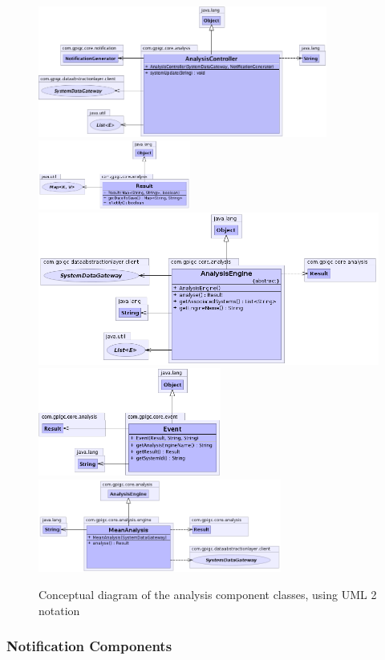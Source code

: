 \documentclass[10pt,a4paper]{article}
\begin{document}
\begin{figure}[ht!]
  \centering
  \includegraphics[width= 9.5cm]{images/Analysis/AnalysisController.png}
  \includegraphics[width= 5cm]{images/Analysis/Result.png}
  \includegraphics[width= 12cm]{images/Analysis/AnalysisEngine.png}
  \includegraphics[width= 6cm]{images/Analysis/Event.png}
  \includegraphics[width= 8cm]{images/Analysis/MeanAnalysis.png}
  \caption{Conceptual diagram of the analysis component classes, using 
UML 2 notation}
  \label{fig:dataAnalysisComponent}
\end{figure}

\subsubsection{Notification Components}
\end{document}
